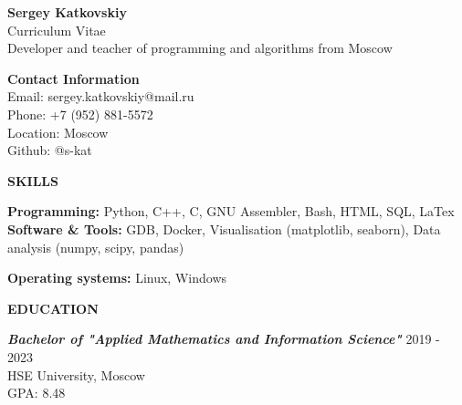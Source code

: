 \documentclass[12pt]{article}
\begin{document}

\begin{center}
	{\Large \bfseries Sergey Katkovskiy} \\ 
	{\large Curriculum Vitae}
	{\\ Developer and teacher of programming and algorithms from Moscow}
\end{center}

	{\noindent \bf Contact Information} \\ 
	Email: sergey.katkovskiy@mail.ru \\ 
	Phone: +7 (952) 881-5572 \\ 
	Location: Moscow \\
	Github: @s-kat


\begin{center}
	{\noindent \bfseries SKILLS}
\end{center}

\vspace{4pt} %

\noindent
{\bfseries Programming:}
\noindent  Python, C++, C, GNU Assembler, Bash, HTML, SQL, LaTex\\ \hfill
\noindent
{\bfseries Software \& Tools:}
\noindent  GDB, Docker, Visualisation (matplotlib, seaborn), Data analysis (numpy, scipy, pandas)\hfill

\noindent
{\bfseries Operating systems:} 
\noindent  Linux, Windows\\ \hfill

\begin{center} %
	{\noindent \bfseries EDUCATION}
\end{center} %

\vspace{4pt} %

\noindent
{\sl \bfseries Bachelor of "Applied Mathematics and Information Science"} \hfill 2019 - 2023 \\ 
\noindent HSE University, Moscow \\
\noindent GPA: 8.48


\end{document}
